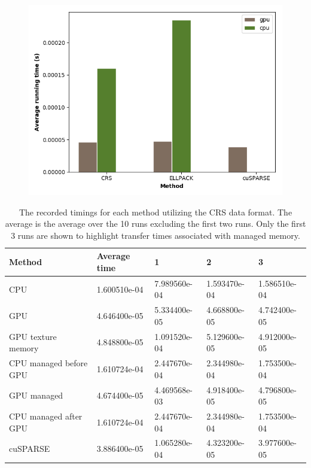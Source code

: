 \documentclass{article} \usepackage[utf8]{inputenc} \usepackage{amsmath}
\begin{document}
\begin{figure}[h] \centering
  \includegraphics[width=0.8\linewidth]{running_times.png}
\label{fig:running_times} \end{figure}


\begin{table}[] 
  \centering 
  \begin{tabular}{|l|l|l|l|l|} 
    \hline Method               & Average time & 1            & 2            & 3 \\
    \hline CPU                      & 1.600510e-04 & 7.989560e-04 & 1.593470e-04 & 1.586510e-04 \\
    \hline GPU                      & 4.646400e-05 & 5.334400e-05 & 4.668800e-05 & 4.742400e-05 \\
    \hline GPU texture memory     & 4.848800e-05 & 1.091520e-04 & 5.129600e-05 & 4.912000e-05 \\
    \hline CPU managed before GPU & 1.610724e-04 & 2.447670e-04 & 2.344980e-04 & 1.753500e-04 \\
    \hline GPU managed            & 4.674400e-05 & 4.469568e-03 & 4.918400e-05 & 4.796800e-05 \\
    \hline CPU managed after GPU  & 1.610724e-04 & 2.447670e-04 & 2.344980e-04 & 1.753500e-04 \\
    \hline cuSPARSE                 & 3.886400e-05 & 1.065280e-04 & 4.323200e-05 & 3.977600e-05 \\ \hline
  \end{tabular} 
  \caption{The recorded timings for each method utilizing the CRS
    data format. The average is the average over the 10 runs excluding the first
    two runs. Only the first 3 runs are shown to highlight transfer times
  associated with managed memory.} 
\end{table}
\end{document}
